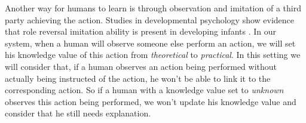\documentclass{llncs}
\begin{document}
%
Another way for humans to learn is through observation and imitation of a third party achieving the action. Studies in developmental psychology show evidence that role reversal imitation ability is present in developing infants \cite{carpenter2005}.
In our system, when a human will observe someone else perform an action, we will set his knowledge value of this action from \textit{theoretical} to \textit{practical}. In this setting we will consider that, if a human observes an action being performed without actually being instructed of the action, he won't be able to link it to the corresponding action. So if a human with a knowledge value set to \textit{unknown} observes this action being performed, we won't update his knowledge value and consider that he still needs explanation.







\end{document}
